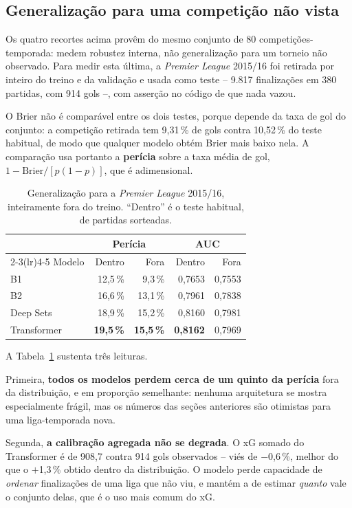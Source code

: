 \documentclass[12pt]{article}
\begin{document}
\subsection{Generalização para uma competição não vista}\label{sec:holdout}

Os quatro recortes acima provêm do mesmo conjunto de 80 competições-temporada:
medem robustez interna, não generalização para um torneio não observado. Para
medir esta última, a \emph{Premier League} 2015/16 foi retirada por inteiro do
treino e da validação e usada como teste -- 9.817 finalizações em 380 partidas,
com 914 gols --, com asserção no código de que nada vazou.

O Brier não é comparável entre os dois testes, porque depende da taxa de gol do
conjunto: a competição retirada tem 9,31\,\% de gols contra 10,52\,\% do teste
habitual, de modo que qualquer modelo obtém Brier mais baixo nela. A comparação
usa portanto a \textbf{perícia} sobre a taxa média de gol,
$1 - \mathrm{Brier}/[p(1-p)]$, que é adimensional.

\begin{table}[ht]
\centering
\caption{Generalização para a \emph{Premier League} 2015/16, inteiramente fora
do treino. ``Dentro'' é o teste habitual, de partidas sorteadas.}
\label{tab:holdout}
\begin{tabular}{@{}lrrrr@{}}
\toprule
 & \multicolumn{2}{c}{Perícia} & \multicolumn{2}{c}{AUC} \\
\cmidrule(lr){2-3}\cmidrule(lr){4-5}
Modelo & Dentro & Fora & Dentro & Fora \\
\midrule
B1 & 12,5\,\% & 9,3\,\% & 0,7653 & 0,7553 \\
B2 & 16,6\,\% & 13,1\,\% & 0,7961 & 0,7838 \\
Deep Sets & 18,9\,\% & 15,2\,\% & 0,8160 & 0,7981 \\
Transformer & \textbf{19,5\,\%} & \textbf{15,5\,\%} & \textbf{0,8162} & 0,7969 \\
\bottomrule
\end{tabular}
\end{table}

A Tabela~\ref{tab:holdout} sustenta três leituras.

Primeira, \textbf{todos os modelos perdem cerca de um quinto da perícia} fora da
distribuição, e em proporção semelhante: nenhuma arquitetura se mostra
especialmente frágil, mas os números das seções anteriores são otimistas para
uma liga-temporada nova.

Segunda, \textbf{a calibração agregada não se degrada}. O xG somado do
Transformer é de 908,7 contra 914 gols observados -- viés de $-$0,6\,\%, melhor
do que o $+$1,3\,\% obtido dentro da distribuição. O modelo perde capacidade de
\emph{ordenar} finalizações de uma liga que não viu, e mantém a de estimar
\emph{quanto} vale o conjunto delas, que é o uso mais comum do xG.
\end{document}
